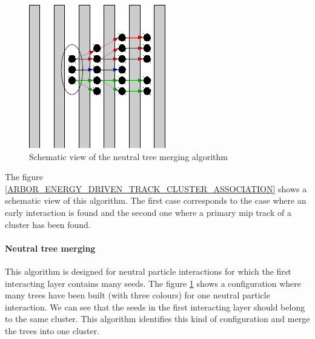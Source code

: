 \documentclass[cits]{JINST}
\begin{document}
\begin{figure}
  \vspace{-30pt}
  \begin{center}
    \includegraphics[width=\linewidth]{NeutralTreeMerging.pdf}
  \end{center}
  \vspace{-10pt}
  \caption{\label{ARBOR_NEUTRAL_TREE_MERGING} Schematic view of the neutral tree merging algorithm}
  \vspace{-40pt}
\end{figure}

The figure \ref{ARBOR_ENERGY_DRIVEN_TRACK_CLUSTER_ASSOCIATION} shows a schematic view of this algorithm. The first case corresponds to the case where an early interaction is found and the second one where a primary mip track of a cluster has been found.

\paragraph*{Neutral tree merging} This algorithm is designed for neutral particle interactions for which the first interacting layer contains many seeds. The figure \ref{ARBOR_NEUTRAL_TREE_MERGING} shows a configuration where many trees have been built (with three colours) for one neutral particle interaction. We can see that the seeds in the first interacting layer should belong to the same cluster. This algorithm identifies this kind of configuration and merge the trees into one cluster.
\end{document}
